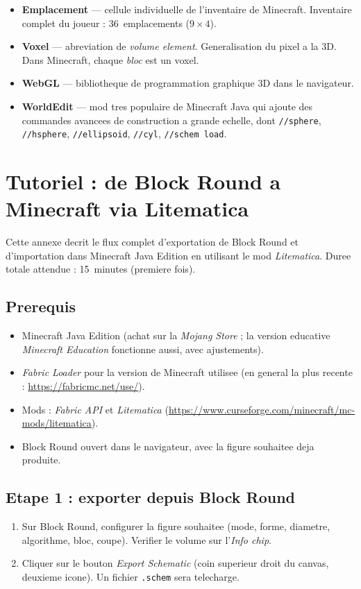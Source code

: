 \documentclass[12pt,a4paper]{scrartcl}
\newcommand{\acc}[1]{\textcolor{accent}{\textbf{#1}}}
\newcommand{\cmd}[1]{\textcolor{earth}{\texttt{\small #1}}}
\begin{document}
\begin{itemize}[leftmargin=1.4em,itemsep=0.3em,topsep=0.3em]
  \item \acc{Emplacement} --- cellule individuelle de l'inventaire de Minecraft. Inventaire complet du joueur : 36~emplacements ($9 \times 4$).
  \item \acc{Voxel} --- abreviation de \emph{volume element}. Generalisation du pixel a la 3D. Dans Minecraft, chaque \emph{bloc} est un voxel.
  \item \acc{WebGL} --- bibliotheque de programmation graphique 3D dans le navigateur.
  \item \acc{WorldEdit} --- mod tres populaire de Minecraft Java qui ajoute des commandes avancees de construction a grande echelle, dont \cmd{//sphere}, \cmd{//hsphere}, \cmd{//ellipsoid}, \cmd{//cyl}, \cmd{//schem load}.
\end{itemize}

\newpage
\section{Tutoriel : de Block Round a Minecraft via Litematica}\label{ap:litematica}

Cette annexe decrit le flux complet d'exportation de Block Round et d'importation dans Minecraft Java Edition en utilisant le mod \emph{Litematica}. Duree totale attendue : 15~minutes (premiere fois).

\subsection{Prerequis}
\begin{itemize}[leftmargin=1.3em,itemsep=0.1em,topsep=0.2em,nosep]
  \item Minecraft Java Edition (achat sur la \emph{Mojang Store} ; la version educative \emph{Minecraft Education} fonctionne aussi, avec ajustements).
  \item \emph{Fabric Loader} pour la version de Minecraft utilisee (en general la plus recente : \url{https://fabricmc.net/use/}).
  \item Mods : \emph{Fabric API} et \emph{Litematica} (\url{https://www.curseforge.com/minecraft/mc-mods/litematica}).
  \item Block Round ouvert dans le navigateur, avec la figure souhaitee deja produite.
\end{itemize}

\subsection{Etape 1 : exporter depuis Block Round}
\begin{enumerate}[leftmargin=1.5em,itemsep=0.15em,topsep=0.3em]
  \item Sur Block Round, configurer la figure souhaitee (mode, forme, diametre, algorithme, bloc, coupe). Verifier le volume sur l'\emph{Info chip}.
  \item Cliquer sur le bouton \emph{Export Schematic} (coin superieur droit du canvas, deuxieme icone). Un fichier \texttt{.schem} sera telecharge.
\end{enumerate}
\end{document}
